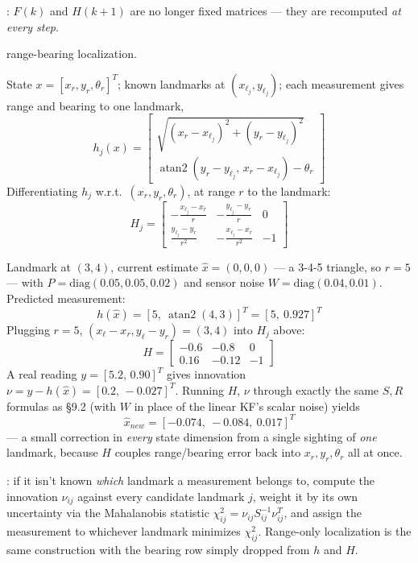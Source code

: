 : $F(k)$ and $H(k{+}1)$ are no longer fixed matrices --- they are recomputed \emph{at every step}.

 range-bearing localization.

State $x=[x_r,y_r,\theta_r]^T$; known landmarks at $(x_{\ell_j},y_{\ell_j})$; each measurement gives range and bearing to one landmark,
\[
h_j(x)=\begin{bmatrix}\sqrt{(x_r-x_{\ell_j})^2+(y_r-y_{\ell_j})^2}\\[2pt] \operatorname{atan2}(y_r-y_{\ell_j},\,x_r-x_{\ell_j})-\theta_r\end{bmatrix}
\]
Differentiating $h_j$ w.r.t.\ $(x_r,y_r,\theta_r)$, at range $r$ to the landmark:
\[
H_j=\begin{bmatrix}-\tfrac{x_{\ell_j}-x_r}{r} & -\tfrac{y_{\ell_j}-y_r}{r} & 0\\[4pt] \tfrac{y_{\ell_j}-y_r}{r^2} & -\tfrac{x_{\ell_j}-x_r}{r^2} & -1\end{bmatrix}
\]

Landmark at $(3,4)$, current estimate $\hat x=(0,0,0)$ --- a 3-4-5 triangle, so $r=5$ --- with $P=\mathrm{diag}(0.05,0.05,0.02)$ and sensor noise $W=\mathrm{diag}(0.04,0.01)$. Predicted measurement:
\[
h(\hat x)=[5,\ \operatorname{atan2}(4,3)]^T=[5,\ 0.927]^T
\]
Plugging $r=5$, $(x_\ell{-}x_r,y_\ell{-}y_r)=(3,4)$ into $H_j$ above:
\[
H=\begin{bmatrix}-0.6&-0.8&0\\0.16&-0.12&-1\end{bmatrix}
\]
A real reading $y=[5.2,\,0.90]^T$ gives innovation $\nu=y-h(\hat x)=[0.2,\,{-}0.027]^T$. Running $H$, $\nu$ through exactly the same $S,R$ formulas as \S9.2 (with $W$ in place of the linear KF's scalar noise) yields
\[
\hat x_{new}=[{-}0.074,\ {-}0.084,\ 0.017]^T
\]
--- a small correction in \emph{every} state dimension from a single sighting of \emph{one} landmark, because $H$ couples range/bearing error back into $x_r,y_r,\theta_r$ all at once.

\begin{notebox}
: if it isn't known \emph{which} landmark a measurement belongs to, compute the innovation $\nu_{ij}$ against every candidate landmark $j$, weight it by its own uncertainty via the Mahalanobis statistic $\chi^2_{ij}=\nu_{ij}S_{ij}^{-1}\nu_{ij}^T$, and assign the measurement to whichever landmark minimizes $\chi^2_{ij}$. Range-only localization is the same construction with the bearing row simply dropped from $h$ and $H$.
\end{notebox}

